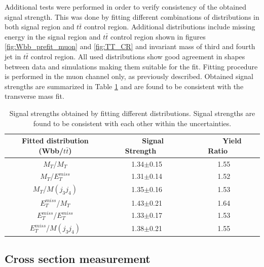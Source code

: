 Additional tests were performed in order to verify consistency of the obtained signal strength.
This was done by fitting different combinations of distributions in both signal region and $t\bar{t}$ control region.
Additional distributions include missing energy in the signal region and $t\bar{t}$ control region shown in figures \ref{fig:Wbb_prefit_muon} and \ref{fig:TT_CR} and invariant mass of third and fourth jet in $t\bar{t}$ control region. All used distributions show good agreement
in shapes between data and simulations making them suitable for the fit. Fitting procedure is performed in the muon channel only, as previously described.
Obtained signal strengths are summarized in Table \ref{tab:addFitTest} and are found to be consistent with the transverse mass fit.
\begin{table}[!htb]
\begin{center}
   \begin{tabular} {ccc} \hline\hline
   Fitted distribution (Wbb/$t\bar{t}$) & ~~~Signal Strength~~~ & ~~~~Yield Ratio~~~ \\
        \hline
        $M_T$/$M_T$                     &1.34$\pm$0.15  &1.55\\
        $M_T$/$E^{miss}_T$              &1.31$\pm$0.14  &1.52\\
        $M_T$/$M(j_3j_4)$               &1.35$\pm$0.16  &1.53\\
        $E^{miss}_T$/$M_T$              &1.43$\pm$0.21  &1.64\\
        $E^{miss}_T$/$E^{miss}_T$       &1.33$\pm$0.17  &1.53\\
        $E^{miss}_T$/$M(j_3j_4)$        &1.38$\pm$0.21  &1.55\\
   \hline\hline
   \end{tabular}
 \caption{Signal strengths obtained by fitting different distributions. Signal strengths are found to be consistent with each other within the uncertainties.}
\label{tab:addFitTest}
\end{center}
\end{table}

\subsection{Cross section measurement}

